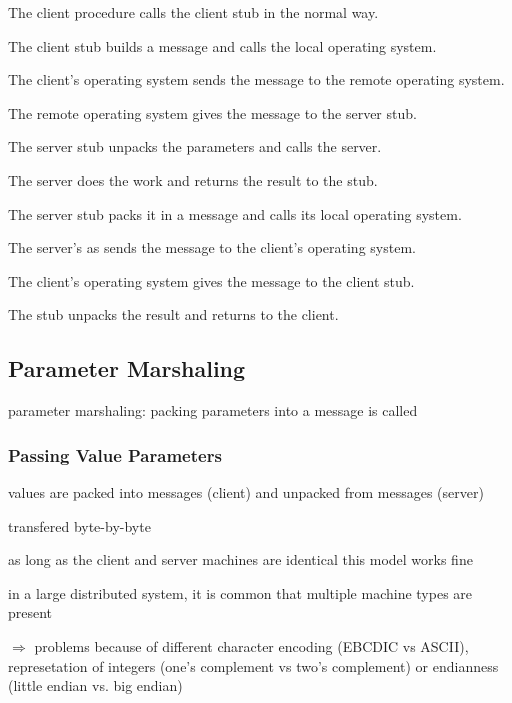 \documentclass[ngerman,a4paper]{report}
\begin{document}
\begin{compactenum}
	\item The client procedure calls the client stub in the normal way.
	\item The client stub builds a message and calls the local operating system.
	\item The client's operating system sends the message to the remote operating system.
	\item The remote operating system gives the message to the server stub.
	\item The server stub unpacks the parameters and calls the server.
	\item The server does the work and returns the result to the stub.
	\item The server stub packs it in a message and calls its local operating system.
	\item The server's as sends the message to the client's operating system.
	\item The client's operating system gives the message to the client stub.
	\item The stub unpacks the result and returns to the client.
\end{compactenum}

\subsection*{Parameter Marshaling}

parameter marshaling: packing parameters into a message is called


\subsubsection*{Passing Value Parameters}

\begin{compactitem}
	\item values are packed into messages (client) and unpacked from messages (server)
	\item transfered byte-by-byte
	\item as long as the client and server machines are identical this model works fine
	\item in a large distributed system, it is common that multiple machine types are present
	\item $\Rightarrow$ problems because of different character encoding (EBCDIC vs ASCII), represetation of integers (one's complement vs two's complement) or endianness (little endian vs. big endian)
\end{compactitem}
\end{document}
